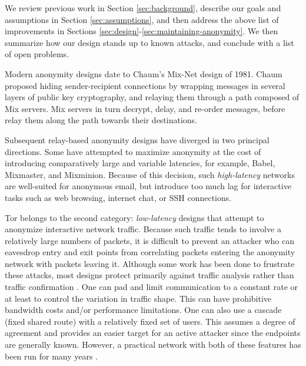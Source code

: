 \documentclass[times,10pt,twocolumn]{article}
\begin{document}
We review previous work in Section \ref{sec:background}, describe
our goals and assumptions in Section \ref{sec:assumptions},
and then address the above list of improvements in Sections
\ref{sec:design}-\ref{sec:maintaining-anonymity}. We then summarize
how our design stands up to known attacks, and conclude with a list of
open problems.


\label{sec:background}

\label{sec:related-work}
Modern anonymity designs date to Chaum's Mix-Net\cite{chaum-mix} design of
1981.  Chaum proposed hiding sender-recipient connections by wrapping
messages in several layers of public key cryptography, and relaying them
through a path composed of Mix servers.  Mix servers in turn decrypt, delay,
and re-order messages, before relay them along the path towards their
destinations.

Subsequent relay-based anonymity designs have diverged in two
principal directions.  Some have attempted to maximize anonymity at
the cost of introducing comparatively large and variable latencies,
for example, Babel\cite{babel}, Mixmaster\cite{mixmaster-spec}, and
Mixminion\cite{minion-design}.  Because of this
decision, such \emph{high-latency} networks are well-suited for anonymous
email, but introduce too much lag for interactive tasks such as web browsing,
internet chat, or SSH connections.

Tor belongs to the second category: \emph{low-latency} designs that
attempt to anonymize interactive network traffic.  Because such
traffic tends to involve a relatively large numbers of packets, it is
difficult to prevent an attacker who can eavesdrop entry and exit
points from correlating packets entering the anonymity network with
packets leaving it. Although some work has been done to frustrate
these attacks, most designs protect primarily against traffic analysis
rather than traffic confirmation \cite{or-jsac98}.  One can pad and
limit communication to a constant rate or at least to control the
variation in traffic shape. This can have prohibitive bandwidth costs
and/or performance limitations. One can also use a cascade (fixed
shared route) with a relatively fixed set of users. This assumes a
degree of agreement and provides an easier target for an active
attacker since the endpoints are generally known. However, a practical
network with both of these features has been run for many years
\cite{web-mix}.
\end{document}
